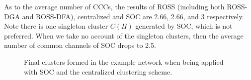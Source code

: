 \documentclass[10pt,journal,compsoc]{IEEEtran}
\theoremstyle{mytheoremstyle}
\theoremstyle{mytheoremstyle}
\theoremstyle{mytheoremstyle}
\begin{document}
As to the average number of CCCs, the results of ROSS (including both ROSS-DGA and ROSS-DFA), centralized and SOC are 2.66, 2.66, and 3 respectively. 
Note there is one singleton cluster $C(H)$ generated by SOC, which is not preferred.
When we take no account of the singleton clusters, then the average number of common channels of SOC drops to 2.5. 
\begin{figure}[ht]
\begin{center}
\hspace{0.15 in}
\end{center}
\caption{Final clusters formed in the example network when being applied with SOC and the centralized clustering scheme.}
\label{fig:final_clustering}
\end{figure}

 
\end{document}
